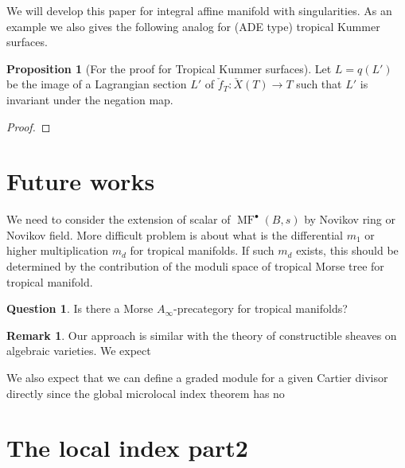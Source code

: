 \documentclass[a4paper,dvipdfmx,reqno,12pt]{amsart}
\theoremstyle{definition}
\newtheorem{Prop}[Thm]{Proposition}
\newtheorem{Ques}[Thm]{Question}
\newtheorem{Rmk}[Thm]{Remark}
\newcommand{\opn}[1]{\operatorname{#1}}
\numberwithin{equation}{section}
\begin{document}
We will develop this paper for integral affine manifold
with singularities. As an example we also gives the 
following analog for (ADE type) tropical Kummer surfaces.

\begin{Prop}[{For the proof for Tropical Kummer surfaces}]
Let $L=q(L')$ be the image of a Lagrangian 
section $L'$ of $\check{f}_{T}:\check{X}(T)\to T$ such 
that $L'$ is invariant under the negation map. 
\end{Prop}
\begin{proof}

\end{proof}


\section{Future works}
We need to consider the extension of scalar of 
$\opn{MF}^{\bullet}(B,s)$ by 
Novikov ring or Novikov field.
More difficult problem is about what is the differential $m_1$ or higher multiplication $m_d$ for tropical manifolds.
If such $m_d$ exists, this should be determined by the contribution of the moduli space of tropical Morse tree for tropical manifold.
\begin{Ques}
  Is there a Morse $A_{\infty}$-precategory for tropical manifolds?
\end{Ques}

\begin{Rmk}
Our approach is similar with the theory of constructible sheaves 
on algebraic varieties.
We expect
\end{Rmk}

We also expect that we can define a graded module for a given
Cartier divisor directly since the global microlocal index
theorem has no 
\appendix

\section{The local index part2}
\end{document}
